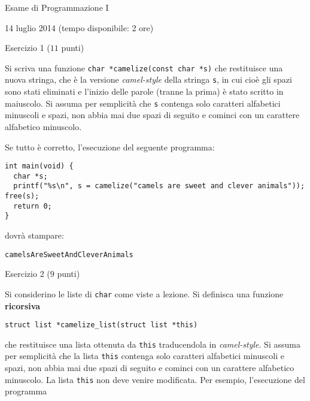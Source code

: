 \documentclass[12pt]{article}
\begin{document}
\begin{center}{\LARGE Esame di Programmazione I}\\
\vspace*{-2ex}
\begin{center}
  \large 14 luglio 2014 (tempo disponibile: 2 ore)
\end{center}
\end{center}
\begin{center}{\Large Esercizio 1} ($11$ punti)
\end{center}
Si scriva una funzione \texttt{char *camelize(const char *s)}
che restituisce una nuova stringa, che \`e la versione
\emph{camel-style} della stringa \texttt{s}, in cui cio\`e gli spazi
sono stati eliminati e l'inizio delle parole (tranne la prima) \`e
stato scritto in maiuscolo. Si assuma per semplicit\`a che
\texttt{s} contenga solo caratteri alfabetici minuscoli e spazi, non abbia
mai due spazi di seguito e cominci con un carattere alfabetico minuscolo.

Se tutto \`e corretto, l'esecuzione del seguente programma:

{\small
\begin{verbatim}
int main(void) {
  char *s;
  printf("%s\n", s = camelize("camels are sweet and clever animals")); free(s);
  return 0;
}
\end{verbatim}}

\noindent
dovr\`a stampare:
%
{\small
\begin{verbatim}
camelsAreSweetAndCleverAnimals
\end{verbatim}}

\vspace*{1ex}
\begin{center}{\Large Esercizio 2} ($9$ punti)\end{center}
%
Si considerino le liste di \texttt{char} come viste a lezione. Si definisca una funzione
\textbf{ricorsiva}
%
\begin{verbatim}
struct list *camelize_list(struct list *this)
\end{verbatim}
%
che restituisce una lista ottenuta da \texttt{this} traducendola in \emph{camel-style}. Si assuma
per semplicit\`a che la lista \texttt{this} contenga
solo caratteri alfabetici minuscoli e spazi, non abbia
mai due spazi di seguito e cominci con un carattere alfabetico minuscolo.
La lista \texttt{this} non deve venire modificata. Per esempio, l'esecuzione del programma
\end{document}

